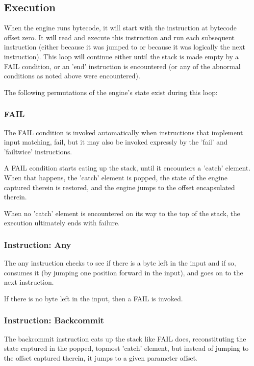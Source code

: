 \subsection{Execution}

When the engine runs bytecode, it will start with the instruction
at bytecode offset zero. It will read and execute this instruction
and run each subsequent instruction (either because it was jumped to
or because it was logically the next instruction).
This loop will continue either until the stack is made empty by a FAIL
condition, or an 'end' instruction is encountered
(or any of the abnormal conditions as noted above were encountered).

The following permutations of the engine's state exist during this loop:

\subsubsection{FAIL}

The FAIL condition is invoked automatically when instructions
that implement input matching, fail, but it may also be invoked
expressly by the 'fail' and 'failtwice' instructions.

A FAIL condition starts eating up the stack, until it encounters
a 'catch' element. When that happens, the 'catch' element is popped,
the state of the engine captured therein is restored, and the engine
jumps to the offset encapsulated therein.

When no 'catch' element is encountered on its way to the top of the stack,
the execution ultimately ends with failure.

\subsubsection{Instruction: Any}

The any instruction checks to see if there is a byte left in the input
and if so, consumes it (by jumping one position forward in the input),
and goes on to the next instruction.

If there is no byte left in the input, then a FAIL is invoked.

\subsubsection{Instruction: Backcommit}

The backcommit instruction eats up the stack like FAIL does,
reconstituting the state captured in the popped, topmost 'catch' element,
but instead of jumping to the offset captured therein, it jumps to
a given parameter offset.

